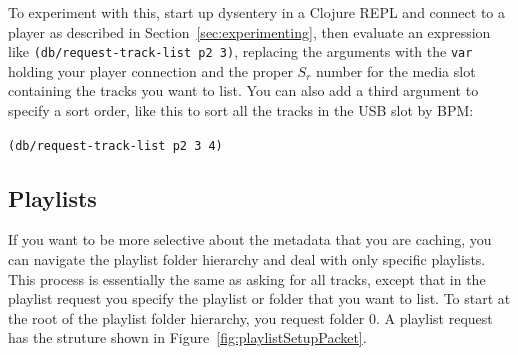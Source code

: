 \documentclass[11pt]{article}
\begin{document}
To experiment with this, start up dysentery in a Clojure REPL and
connect to a player as described in Section~\ref{sec:experimenting},
then evaluate an expression like {\tt (db/request-track-list p2 3)},
replacing the arguments with the {\tt var} holding your player
connection and the proper $S_r$ number for the media slot containing
the tracks you want to list. You can also add a third argument to
specify a sort order, like this to sort all the tracks in the USB slot
by BPM:

{\tt (db/request-track-list p2 3 4)}


\subsection{Playlists}
\label{sec:playlists}

If you want to be more selective about the metadata that you are
caching, you can navigate the playlist folder hierarchy and deal with
only specific playlists. This process is essentially the same as asking
for all tracks, except that in the playlist request you specify the
playlist or folder that you want to list. To start at the root of the
playlist folder hierarchy, you request folder 0. A playlist request
has the struture shown in Figure~\ref{fig:playlistSetupPacket}.
\end{document}
